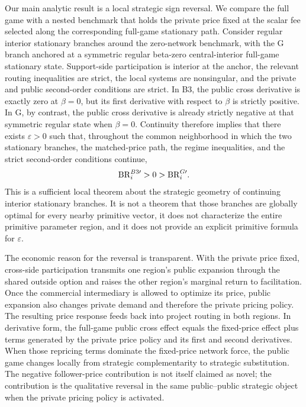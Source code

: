 Our main analytic result is a local strategic sign reversal. We compare the full game with a nested benchmark that holds the private price fixed at the scalar fee selected along the corresponding full-game stationary path. Consider regular interior stationary branches around the zero-network benchmark, with the G branch anchored at a symmetric regular beta-zero central-interior full-game stationary state. Support-side participation is interior at the anchor, the relevant routing inequalities are strict, the local systems are nonsingular, and the private and public second-order conditions are strict. In B3, the public cross derivative is exactly zero at $\beta=0$, but its first derivative with respect to $\beta$ is strictly positive. In G, by contrast, the public cross derivative is already strictly negative at that symmetric regular state when $\beta=0$. Continuity therefore implies that there exists $\varepsilon>0$ such that, throughout the common neighborhood in which the two stationary branches, the matched-price path, the regime inequalities, and the strict second-order conditions continue,
\[
\mathrm{BR}_i^{B3\prime}>0>\mathrm{BR}_i^{G\prime}.
\]
This is a sufficient local theorem about the strategic geometry of continuing interior stationary branches. It is not a theorem that those branches are globally optimal for every nearby primitive vector, it does not characterize the entire primitive parameter region, and it does not provide an explicit primitive formula for $\varepsilon$.

The economic reason for the reversal is transparent. With the private price fixed, cross-side participation transmits one region's public expansion through the shared outside option and raises the other region's marginal return to facilitation. Once the commercial intermediary is allowed to optimize its price, public expansion also changes private demand and therefore the private pricing policy. The resulting price response feeds back into project routing in both regions. In derivative form, the full-game public cross effect equals the fixed-price effect plus terms generated by the private price policy and its first and second derivatives. When those repricing terms dominate the fixed-price network force, the public game changes locally from strategic complementarity to strategic substitution. The negative follower-price contribution is not itself claimed as novel; the contribution is the qualitative reversal in the same public--public strategic object when the private pricing policy is activated.

